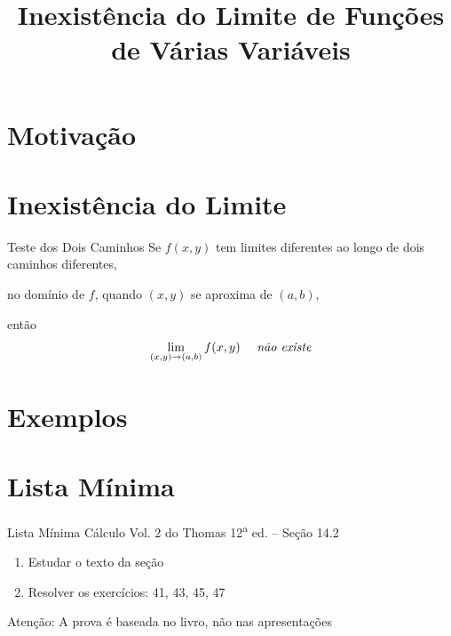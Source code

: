 \documentclass[fleqn,utf8,aspectratio=169,12pt]{beamer}
\title{Inexistência do Limite de Funções de Várias Variáveis}
\begin{document}
\addtitle

\section{Motivação}



\section{Inexistência do Limite}

\begin{frame}{Teste dos Dois Caminhos}
  Se \(f(x, y)\) tem limites diferentes ao longo de dois caminhos
  diferentes,

  no domínio de $f$,
  \pause
  quando $(x, y)$ se aproxima de $(a, b)$,

  \pause
  então
  \[
    \lim_{(x, y)\to(a, b)} f(x, y) \quad \text{ \emph{não existe}}
  \]
\end{frame}

\section{Exemplos}






\section{Lista Mínima}

\begin{frame}{Lista Mínima}
  Cálculo Vol. 2 do Thomas 12\textsuperscript{a} ed. -- Seção 14.2
  \begin{enumerate}
    \item Estudar o texto da seção
    \item Resolver os exercícios: 41, 43, 45, 47
  \end{enumerate}

  \vfill
  Atenção: A prova é baseada no livro, não nas apresentações
\end{frame}

\end{document}
